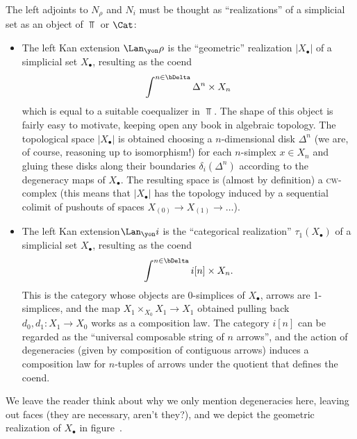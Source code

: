 The left adjoints to $N_\rho$ and $N_i$ must be thought as ``realizations'' of a simplicial set as an object of $\Top$ or $\Cat$:
\begin{itemize}
\item The left Kan extension $\Lan_\yon \rho$ is the ``geometric'' realization $|X_\bullet|$ of a simplicial set $X_\bullet$, resulting as the coend
\[
\int^{n\in\bDelta} \Delta^n \times X_n
\]
which is equal to a suitable coequalizer in $\Top$. The shape of this object is fairly easy to motivate, keeping open any book in algebraic topology. The topological space $|X_\bullet|$ is obtained choosing a $n$-dimensional disk $\Delta^n$ (we are, of course, reasoning up to isomorphism!) for each $n$-simplex $x \in X_n$ and gluing these disks along their boundaries $\delta_i(\Delta^n)$ according to the degeneracy maps of $X_\bullet$. The resulting space is (almost by definition) a \textsc{cw}-complex (this means that  $|X_\bullet|$ has the topology induced by a sequential colimit of pushouts of spaces $X_{(0)} \to X_{(1)} \to\dots $).
\item The left Kan extension$\Lan_\yon i$ is the ``categorical realization'' $\tau_1(X_\bullet)$ of a simplicial set $X_\bullet$, resulting as the coend
\[
\int^{n\in\bDelta} i[n] \times X_n.
\]
This is the category whose objects are 0-simplices of $X_\bullet$, arrows are 1-simplices, and the map $X_1\times_{X_0}X_1\to X_1$ obtained pulling back $d_0,d_1\colon X_1 \to X_0$ works as a composition law. The category $i[n]$ can be regarded as the ``universal composable string of $n$ arrows'', and the action of degeneracies (given by composition of contiguous arrows) induces a composition law for $n$-tuples of arrows under the quotient that defines the coend.
\end{itemize}
We leave the reader think about why we only mention degeneracies here, leaving out faces (they are necessary, aren't they?), and we depict the geometric realization of $X_\bullet$ in figure~.
